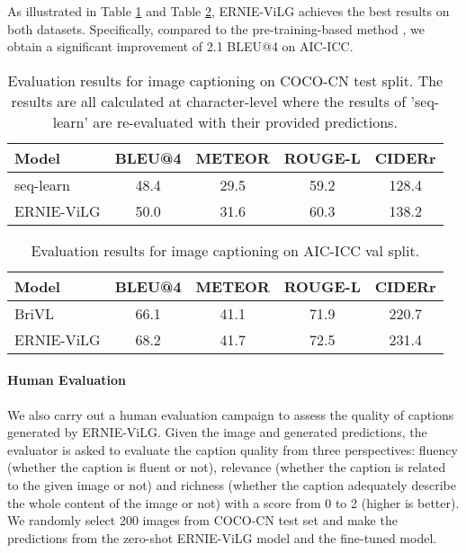 \documentclass{article}
\begin{document}
As illustrated in Table \ref{exp-ft-i2t-auto-cococn-result} and Table \ref{exp-ft-i2t-auto-aicicc-result}, ERNIE-ViLG achieves the best results on both datasets. Specifically, compared to the pre-training-based method \cite{huo2021wenlan}, we obtain a significant improvement of 2.1 BLEU@4 on AIC-ICC.

\begin{table}[htb]
  \caption{Evaluation results for image captioning on COCO-CN test split. The results are all calculated at character-level where the results of 'seq-learn' are re-evaluated with their provided predictions.}
  \begin{tabular}{l|cccc}
    \toprule
    Model    & BLEU@4 & METEOR & ROUGE-L & CIDERr \\
    \midrule
    seq-learn \cite{li2019cococn} & 48.4 & 29.5 & 59.2 & 128.4 \\
    \midrule
    ERNIE-ViLG & 50.0 & 31.6 & 60.3 & 138.2 \\
    \bottomrule
  \end{tabular}
  \label{exp-ft-i2t-auto-cococn-result}
  \centering
\end{table}

\begin{table}[htb]
  \caption{Evaluation results for image captioning on AIC-ICC val split.}
  \begin{tabular}{l|cccc}
    \toprule
    Model    & BLEU@4 & METEOR & ROUGE-L & CIDERr \\
    \midrule
    BriVL \cite{huo2021wenlan} & 66.1 & 41.1 & 71.9 & 220.7 \\
    \midrule
    ERNIE-ViLG & 68.2 & 41.7 & 72.5 & 231.4 \\
    \bottomrule
  \end{tabular}
  \label{exp-ft-i2t-auto-aicicc-result}
  \centering
\end{table}

\paragraph{Human Evaluation}
We also carry out a human evaluation campaign to assess the quality of captions generated by ERNIE-ViLG. Given the image and generated predictions, the evaluator is asked to evaluate the caption quality from three perspectives: fluency (whether the caption is fluent or not), relevance (whether the caption is related to the given image or not) and richness (whether the caption adequately describe the whole content of the image or not) with a score from 0 to 2 (higher is better).
We randomly select 200 images from COCO-CN test set and make the predictions from the zero-shot ERNIE-ViLG model and the fine-tuned model. 
\end{document}
